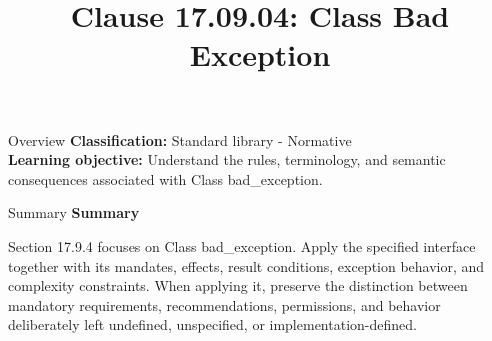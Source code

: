 \documentclass[10pt,letterpaper]{article}
\title{Clause 17.09.04: Class Bad Exception}
\author{}
\date{}
\begin{document}
\maketitle
\begin{CornellOverviewBox}{Overview}
\textbf{Classification:} Standard library - Normative\\[2pt]
\textbf{Learning objective:} Understand the rules, terminology, and semantic consequences associated with Class bad\_exception.
\end{CornellOverviewBox}\begin{CornellSummaryBox}{Summary}
{\sffamily\bfseries\color{Accent} Summary}\par\vspace{3pt}Section 17.9.4 focuses on Class bad\_exception. Apply the specified interface together with its mandates, effects, result conditions, exception behavior, and complexity constraints. When applying it, preserve the distinction between mandatory requirements, recommendations, permissions, and behavior deliberately left undefined, unspecified, or implementation-defined.
\end{CornellSummaryBox}
\end{document}
